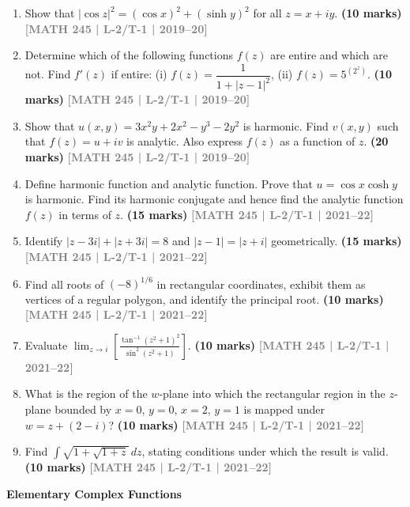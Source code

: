 \documentclass[12pt,a4paper]{article}
\newcommand{\yr}[1]{\hfill\textcolor{gray}{\small\textbf{[#1]}}}
\newcommand{\mk}[1]{\textcolor{orange!70!black}{\small\textbf{(#1 marks)}}}
\newcommand{\subtopic}[2]{%
  \vspace{10pt}
  \noindent\begin{tcolorbox}[colback=#1!8,colframe=#1,boxrule=0.6pt,arc=4pt,
    left=6pt,right=6pt,top=4pt,bottom=4pt]
    \small\bfseries\textcolor{#1}{#2}
  \end{tcolorbox}
  \vspace{2pt}
}
\begin{document}
\begin{enumerate}
\item Show that $|\cos z|^{2}=(\cos x)^{2}+(\sinh y)^{2}$ for all $z=x+iy$.
\mk{10} \yr{MATH 245 | L-2/T-1 | 2019--20}

\item Determine which of the following functions $f(z)$ are entire and which are not. Find $f'(z)$ if entire: (i) $f(z)=\dfrac{1}{1+|z-1|^{2}}$, (ii) $f(z)=5^{(2^{z})}$.
\mk{10} \yr{MATH 245 | L-2/T-1 | 2019--20}

\item Show that $u(x,y)=3x^{2}y+2x^{2}-y^{3}-2y^{2}$ is harmonic. Find $v(x,y)$ such that $f(z)=u+iv$ is analytic. Also express $f(z)$ as a function of $z$.
\mk{20} \yr{MATH 245 | L-2/T-1 | 2019--20}

\item Define harmonic function and analytic function. Prove that $u=\cos x\cosh y$ is harmonic. Find its harmonic conjugate and hence find the analytic function $f(z)$ in terms of $z$.
\mk{15} \yr{MATH 245 | L-2/T-1 | 2021--22}

\item Identify $|z-3i|+|z+3i|=8$ and $|z-1|=|z+i|$ geometrically.
\mk{15} \yr{MATH 245 | L-2/T-1 | 2021--22}

\item Find all roots of $(-8)^{1/6}$ in rectangular coordinates, exhibit them as vertices of a regular polygon, and identify the principal root.
\mk{10} \yr{MATH 245 | L-2/T-1 | 2021--22}

\item Evaluate $\displaystyle\lim_{z\to i}\left[\frac{\tan^{-1}(z^{2}+1)^{2}}{\sin^{2}(z^{2}+1)}\right]$.
\mk{10} \yr{MATH 245 | L-2/T-1 | 2021--22}

\item What is the region of the $w$-plane into which the rectangular region in the $z$-plane bounded by $x=0$, $y=0$, $x=2$, $y=1$ is mapped under $w=z+(2-i)$?
\mk{10} \yr{MATH 245 | L-2/T-1 | 2021--22}

\item Find $\displaystyle\int\sqrt{1+\sqrt{1+z}}\,dz$, stating conditions under which the result is valid.
\mk{10} \yr{MATH 245 | L-2/T-1 | 2021--22}

\end{enumerate}

\subtopic{cE}{Elementary Complex Functions}
\label{sub:s5-elementary}
\end{document}
